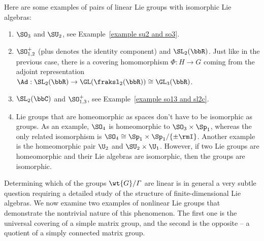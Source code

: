\begin{example}
    Here are some examples of pairs of linear Lie groups with isomorphic Lie algebras:
    \begin{enumerate}
        \item $\SO_3$ and $\SU_2$, see Example~\ref{example su2 and so3}.
        \item $\SO^+_{1,2}$ (plus denotes the identity component) and $\SL_2(\bbR)$. Just like in the previous case, there is a covering homomorphism $\Phi:H\to G$ coming from the adjoint representation $\Ad:\SL_2(\bbR)\to \GL(\fraksl_2(\bbR))\cong \GL_3(\bbR)$.
        \item $\SL_2(\bbC)$ and $\SO_{1,3}^+$, see Example~\ref{example so13 and sl2c}.
        \item Lie groups that are homeomorphic as spaces don't have to be isomorphic as groups. As an example, $\SO_4$ is homeomorphic to $\SO_3\times \Sp_1$, whereas the only related isomorphism is $\SO_4\cong \Sp_1\times\Sp_1\slash \{\pm \rmI\}$. Another example is the homeomorphic pair $\U_2$ and $\SU_2\times \U_1$. However, if two Lie groups are homeomorphic and their Lie algebras are isomorphic, then the groups are isomorphic.
    \end{enumerate}
\end{example}


Determining which of the groups $\wt{G}\slash \varGamma$ are linear is in general a very subtle question requiring a detailed study of the structure of finite-dimensional Lie algebras. We now examine two examples of nonlinear Lie groups that demonstrate the nontrivial nature of this phenomenon. The first one is the universal covering of a simple matrix group, and the second is the opposite -- a quotient of a simply connected matrix group.

